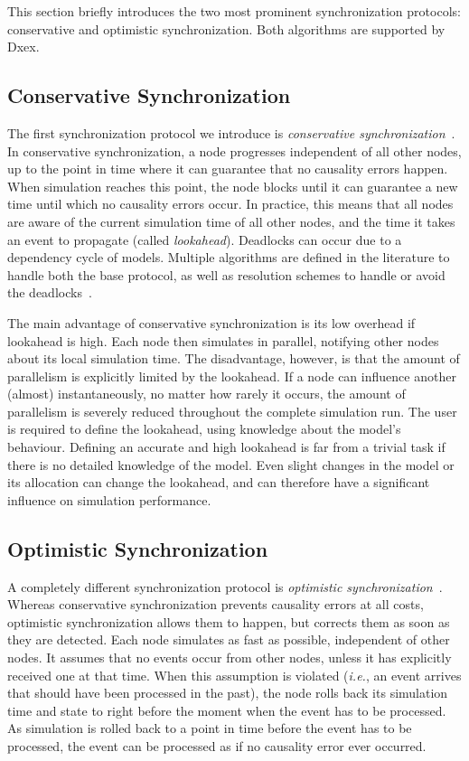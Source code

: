 This section briefly introduces the two most prominent synchronization protocols: conservative and optimistic synchronization.
Both algorithms are supported by Dxex.

\subsection{Conservative Synchronization}
The first synchronization protocol we introduce is \textit{conservative synchronization}~\cite{FujimotoBook}.
In conservative synchronization, a node progresses independent of all other nodes, up to the point in time where it can guarantee that no causality errors happen.
When simulation reaches this point, the node blocks until it can guarantee a new time until which no causality errors occur.
In practice, this means that all nodes are aware of the current simulation time of all other nodes, and the time it takes an event to propagate (called \textit{lookahead}).
Deadlocks can occur due to a dependency cycle of models.
Multiple algorithms are defined in the literature to handle both the base protocol, as well as resolution schemes to handle or avoid the deadlocks~\cite{FujimotoBook}.

The main advantage of conservative synchronization is its low overhead if lookahead is high.
Each node then simulates in parallel, notifying other nodes about its local simulation time.
The disadvantage, however, is that the amount of parallelism is explicitly limited by the lookahead.
If a node can influence another (almost) instantaneously, no matter how rarely it occurs, the amount of parallelism is severely reduced throughout the complete simulation run.
The user is required to define the lookahead, using knowledge about the model's behaviour.
Defining an accurate and high lookahead is far from a trivial task if there is no detailed knowledge of the model.
Even slight changes in the model or its allocation can change the lookahead, and can therefore have a significant influence on simulation performance.

\subsection{Optimistic Synchronization}
A completely different synchronization protocol is \textit{optimistic synchronization}~\cite{TimeWarp}.
Whereas conservative synchronization prevents causality errors at all costs, optimistic synchronization allows them to happen, but corrects them as soon as they are detected.
Each node simulates as fast as possible, independent of other nodes.
It assumes that no events occur from other nodes, unless it has explicitly received one at that time.
When this assumption is violated (\textit{i.e.}, an event arrives that should have been processed in the past), the node rolls back its simulation time and state to right before the moment when the event has to be processed.
As simulation is rolled back to a point in time before the event has to be processed, the event can be processed as if no causality error ever occurred.

